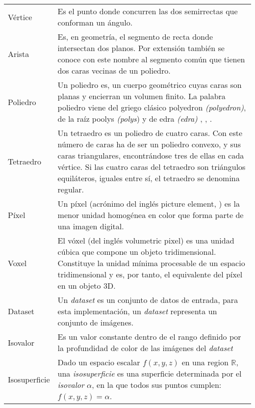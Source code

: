\begin{table}[h!t]
	\begin{tabular}{lp{11cm}}
	Vértice   & Es el punto donde concurren las dos semirrectas que conforman un ángulo.\\

	Arista    & Es, en geometría, el segmento de recta donde intersectan dos planos. Por extensión también se conoce con este
			nombre al segmento común que tienen dos caras vecinas de un poliedro.\\

	Poliedro  & Un poliedro es, un cuerpo geométrico cuyas caras son planas y encierran un volumen finito. La palabra poliedro
			viene del griego clásico \textgreek{polyedron} \emph{(polyedron)}, de la raíz \textgreek{poolys} \emph{(polys})
			\jcq{muchas} y de \textgreek{edra} \emph{(edra)} \jcq{base}, \jcq{asiento}, \jcq{cara}.\\

	Tetraedro & Un tetraedro es un poliedro de cuatro caras. Con este número de caras ha de ser un
			poliedro convexo, y sus caras triangulares, encontrándose tres de ellas en cada vértice. Si las
			cuatro caras del tetraedro son triángulos equiláteros, iguales entre sí, el tetraedro se denomina
			regular.\\

	Píxel     & Un píxel (acrónimo del inglés picture element, \jcq{elemento de imagen}) es la menor unidad homogénea en color
			que forma parte de una imagen digital.\\

	Voxel     & El vóxel (del inglés volumetric pixel) es una unidad cúbica que compone un objeto
			tridimensional. Constituye la unidad mínima procesable de un espacio tridimensional y es, por
			tanto, el equivalente del píxel en un objeto 3D.\\

	Dataset   & Un \emph{dataset} es un conjunto de datos de entrada, para esta
			implementación, un \emph{dataset} representa un conjunto de imágenes.\\

	Isovalor	& Es un valor constante dentro de el rango definido por la profundidad de 					color de las imágenes del \emph{dataset}\\

	Isosuperficie	& Dado un espacio escalar $f(x,y,z)$ en una region $\mathbb{R}$, una \emph{isosuperficie} es una superficie determinada por el \emph{isovalor} $\alpha$, en la que todos sus puntos cumplen: $f(x,y,z) = \alpha$.\\

	\end{tabular}
\end{table}
